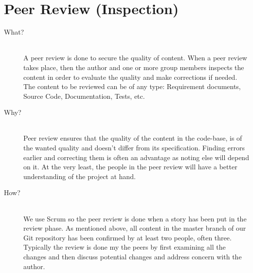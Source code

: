 \section*{Peer Review (Inspection)}
\label{sec:peerreview}
\begin{description}
    \item[What?]\hfill\\
    A peer review is done to secure the quality of content. 
    When a peer review takes place, then the author and one or more group members inspects the content in order to evaluate the quality and make corrections if needed. 
    The content to be reviewed can be of any type: Requirement documents, Source Code, Documentation, Tests, etc.
    \item[Why?]\hfill\\ 
    Peer review ensures that the quality of the content in the code-base, is of the wanted quality and doesn't differ from its specification. 
    Finding errors earlier and correcting them is often an advantage as noting else will depend on it. 
    At the very least, the people in the peer review will have a better understanding of the project at hand.
    \item[How?]\hfill\\
    We use Scrum so the peer review is done when a story has been put in the review phase. 
    As mentioned above, all content in the master branch of our Git repository has been confirmed by at least two people, often three. 
    Typically the review is done my the peers by first examining all the changes and then discuss potential changes and address concern with the author. 
\end{description}